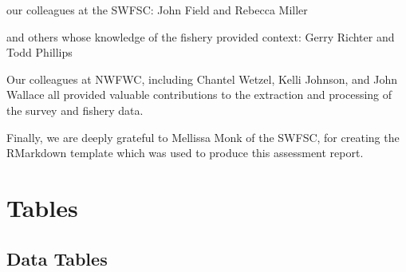 \documentclass[12pt,]{article}
\begin{document}
our colleagues at the SWFSC: John Field and Rebecca Miller

and others whose knowledge of the fishery provided context: Gerry
Richter and Todd Phillips

Our colleagues at NWFWC, including Chantel Wetzel, Kelli Johnson, and
John Wallace all provided valuable contributions to the extraction and
processing of the survey and fishery data.

Finally, we are deeply grateful to Mellissa Monk of the SWFSC, for
creating the RMarkdown template which was used to produce this
assessment report.

\newpage
\FloatBarrier
\newpage

\hypertarget{tables}{%
\section{Tables}\label{tables}}

\hypertarget{data-tables}{%
\subsection{Data Tables}\label{data-tables}}
\end{document}
